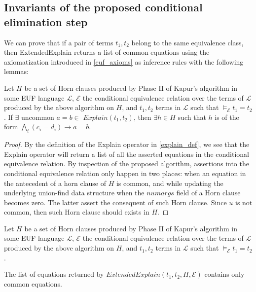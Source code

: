 \subsection{Invariants of the proposed
conditional elimination step}

We can prove that if a pair of terms $t_1, t_2$ belong
to the same equivalence class, then ExtendedExplain returns
a list of common equations 
using the axiomatization introduced in \ref{euf_axioms} as 
inference rules with the following lemmas:

\begin{lemma} \label{existence_horn_in_explain}
  Let $H$ be a set of Horn clauses produced by Phase II
  of Kapur's algorithm in some EUF language $\mathcal{L}$, 
  $\mathcal{E}$ the conditional 
  equivalence relation over the terms of 
  $\mathcal{L}$ produced by the above algorithm on $H$,
  and $t_1, t_2$ terms in 
  $\mathcal{L}$ such that
  $\models_{\mathcal{E}} t_1 = t_2$.
  If $\exists \text{ uncommon } a = b \in$
  $Explain(t_1, t_2)$, then $\exists h \in H$ such 
  that $h$ is of the form 
  $\bigwedge_i (c_i = d_i) \rightarrow a = b$.
\end{lemma}

\begin{proof}
  By the definition of the Explain operator in \ref{explain_def},
  we see that the Explain operator will return a
  list of all the asserted equations in the conditional
  equivalence relation. By inspection of the proposed
  algorithm, assertions into the conditional equivalence
  relation only happen in two places: when an equation 
  in the antecedent of a horn clause of $H$ is common, 
  and while updating the underlying union-find data structure
  when the $numargs$ field of a Horn clause becomes
  zero. The latter assert the consequent of such Horn clause.
  Since $u$ is not common, then such Horn clause 
  should exists in $H$.
\end{proof}

\begin{lemma}

  Let $H$ be a set of Horn clauses produced by Phase II
  of Kapur's algorithm in some EUF language 
  $\mathcal{L}$, $\mathcal{E}$ the conditional 
  equivalence relation over the terms of 
  $\mathcal{L}$ produced by the above algorithm on $H$,
  and $t_1, t_2$ terms in 
  $\mathcal{L}$ such that
  $\models_{\mathcal{E}} t_1 = t_2$.

  The list of equations returned by $ExtendedExplain(t_1, t_2, 
  H, \mathcal{E})$ contains only common equations.
\end{lemma}

